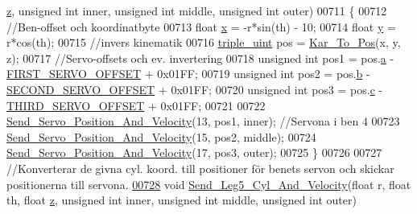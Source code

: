 \begin{DoxyCode}
      \hyperlink{over__hinder_8c_af73583b1e980b0aa03f9884812e9fd4d}{z}, \textcolor{keywordtype}{unsigned} \textcolor{keywordtype}{int} inner, \textcolor{keywordtype}{unsigned} \textcolor{keywordtype}{int} middle, \textcolor{keywordtype}{unsigned} \textcolor{keywordtype}{int} outer)
00711 \{
00712     \textcolor{comment}{//Ben-offset och koordinatbyte}
00713     \textcolor{keywordtype}{float} \hyperlink{sensor_8h_a6c4b361d72eb3767ba424ac9a6ecf52b}{x} = -r*sin(th) - 10;
00714     \textcolor{keywordtype}{float} \hyperlink{sensor_8h_a0ed6a908288e0cd87f79c1b5ab56d07c}{y} = r*cos(th);
00715     \textcolor{comment}{//invers kinematik }
00716     \hyperlink{structtriple__uint}{triple\_uint} pos = \hyperlink{invers__kinematik_8c_a68f82386196ad991ed54fb9796d90f7c}{Kar\_To\_Pos}(x, y, z);
00717     \textcolor{comment}{//Servo-offsets och ev. invertering }
00718     \textcolor{keywordtype}{unsigned} \textcolor{keywordtype}{int} pos1 = pos.\hyperlink{structtriple__uint_a0ea8a85723620c90be9fd2a693f12a59}{a} - \hyperlink{servo___u_a_r_t_8c_a4c437d01d2f060ec86c16ed5e76efe45}{FIRST\_SERVO\_OFFSET} + 0x01FF;
00719     \textcolor{keywordtype}{unsigned} \textcolor{keywordtype}{int} pos2 = pos.\hyperlink{structtriple__uint_a790d5baa17ec7aaf7bb49750a16e9c29}{b} - \hyperlink{servo___u_a_r_t_8c_acb02dedbe5ff19694bdb5b2ddf61664a}{SECOND\_SERVO\_OFFSET} + 0x01FF;
00720     \textcolor{keywordtype}{unsigned} \textcolor{keywordtype}{int} pos3 = pos.\hyperlink{structtriple__uint_a6ce17b018c47d0f1d0e53a458f741ad3}{c} - \hyperlink{servo___u_a_r_t_8c_ac2f065c44b617c91ea7f4237e8ead729}{THIRD\_SERVO\_OFFSET} + 0x01FF;
00721     
00722     \hyperlink{servo___u_a_r_t_8c_aef28545296037ecc0350638a407a680f}{Send\_Servo\_Position\_And\_Velocity}(13, pos1, inner); \textcolor{comment}{//Servona i ben 4}
00723     \hyperlink{servo___u_a_r_t_8c_aef28545296037ecc0350638a407a680f}{Send\_Servo\_Position\_And\_Velocity}(15, pos2, middle);
00724     \hyperlink{servo___u_a_r_t_8c_aef28545296037ecc0350638a407a680f}{Send\_Servo\_Position\_And\_Velocity}(17, pos3, outer);
00725 \}
00726 
00727 \textcolor{comment}{//Konverterar de givna cyl. koord. till positioner för benets servon och skickar positionerna till servona.}
\hypertarget{servo___u_a_r_t_8c_source.tex_l00728}{}\hyperlink{servo___u_a_r_t_8h_aacc5d4be18de766587abbb83098916a3}{00728} \textcolor{keywordtype}{void} \hyperlink{servo___u_a_r_t_8c_aacc5d4be18de766587abbb83098916a3}{Send\_Leg5\_Cyl\_And\_Velocity}(\textcolor{keywordtype}{float} r, \textcolor{keywordtype}{float} th, \textcolor{keywordtype}{float} 
      \hyperlink{over__hinder_8c_af73583b1e980b0aa03f9884812e9fd4d}{z}, \textcolor{keywordtype}{unsigned} \textcolor{keywordtype}{int} inner, \textcolor{keywordtype}{unsigned} \textcolor{keywordtype}{int} middle, \textcolor{keywordtype}{unsigned} \textcolor{keywordtype}{int} outer)

\end{DoxyCode}
